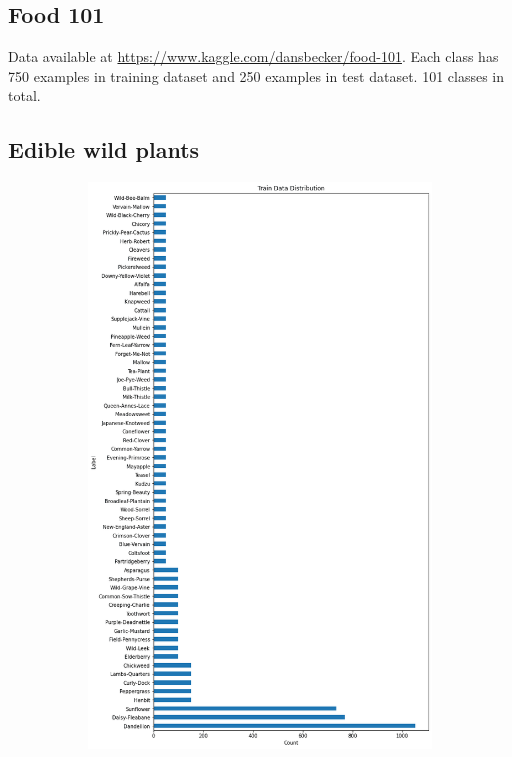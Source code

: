 \FloatBarrier

\subsection{Food 101}\label{appendix:datasets:food101}

Data available at \url{https://www.kaggle.com/dansbecker/food-101}. Each class has 750 examples in training dataset and 250 examples in test dataset. 101 classes in total.

\FloatBarrier

\subsection{Edible wild plants}\label{appendix:datasets:edible-plants}

\begin{figure}[ht]
  \centering
 \begin{subfigure}{.48\textwidth}
    \centering
    \includegraphics[width=\textwidth]{appendixes/images/edible-train.png}

\end{subfigure}
\end{figure}
